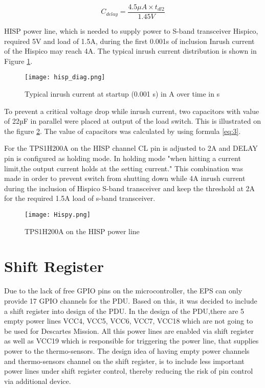 \begin{equation} \label{eq: t2}
C_{delay} = \frac{4.5\mu A \times t_{dl2}}{1.45V} 
\end{equation}



 HISP power line, which is needed to supply power to S-band transceiver Hispico, required 5V and load of 1.5A, during the first 0.001s of inclusion Inrush current of the Hispico may reach 4A. The typical inrush current distribution is shown in Figure \ref{fig: hisp_inr}.

\begin{figure}[h]
	\centering
	\texttt{[image: hisp\_diag.png]}
	\caption{Typical inrush current at startup (0.001 s) in A over time in s}
	\label{fig: hisp_inr}
\end{figure} 

To prevent a critical voltage drop while inrush current, two capacitors with value of 22µF in parallel were placed at output of the load switch. This is illustrated on the figure \ref{fig: hispico}. The value of capacitors was calculated by using formula \ref{eq:3}.

For the TPS1H200A on the HISP channel CL pin is adjusted to 2A and DELAY pin is configured as holding mode. In holding mode \cite{28}"when hitting a current limit,the output current holds at the setting current." This combination was made in order to prevent switch from shutting down while 4A inrush current during the inclusion of Hispico S-band transceiver and keep the threshold at 2A for the required 1.5A load of s-band transceiver. 
 


\begin{figure}[h]
	\centering
	\texttt{[image: Hispy.png]}
	\caption{TPS1H200A on the HISP power line}
	\label{fig: hispico}
\end{figure}



 
\section{Shift Register}\label{shiftty}

Due to the lack of free GPIO pins on the microcontroller, the EPS can only provide 17 GPIO channels for the PDU. Based on this, it was decided to include a shift register into design of the PDU. In the design of the PDU,there are 5 empty power lines VCC4, VCC5, VCC6, VCC7, VCC18 which are not going to be used for Descartes Mission. All this power lines are enabled via shift register as well as VCC19 which is responsible for triggering the power line, that supplies power to the thermo-sensors. The design idea of having empty power channels and thermo-sensors channel on the shift register, is to include less important power lines under shift register control, thereby reducing the risk of pin control via additional device. 


